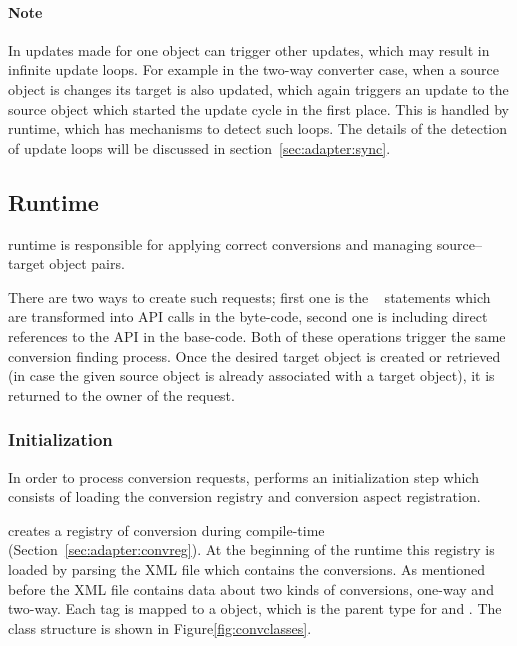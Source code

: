 \paragraph{Note} In \zamk updates made for one object can trigger other updates, which may result in infinite update loops. 
For example in the two-way converter case, when a source object is changes its target is also updated, which again triggers an update to the source object which started the update cycle in the first place. 
This is handled by \zamk runtime, which has mechanisms to detect such loops. The details of the detection of update loops will be discussed in section~\ref{sec:adapter:sync}.



\subsection{Runtime}
\label{sec:adapter:runtime}
\zamk runtime is responsible for applying correct conversions and managing source--target object pairs. 

There are two ways to create such requests; first one is the \gluer~ statements which are transformed into \zamk API calls in the byte-code, second one is including direct references to the \zamk API in the base-code. 
Both of these operations trigger the same conversion finding process. 
Once the desired target object is created or retrieved (in case the given source object is already associated with a target object), it is returned to the owner of the request. 


\subsubsection{Initialization}
\label{sec:adapter:loadconvreg}
In order to process conversion requests, \zamk performs an initialization step which consists of loading the conversion registry and conversion aspect registration. 

\zamk creates a registry of conversion during compile-time (Section~\ref{sec:adapter:convreg}). 
At the beginning of the runtime this registry is loaded by parsing the XML file which contains the conversions. 
As mentioned before the XML file contains data about two kinds of conversions, one-way and two-way.
Each  tag is mapped to a  object, which is the parent type for  and .
The class structure is shown in Figure\ref{fig:convclasses}.

